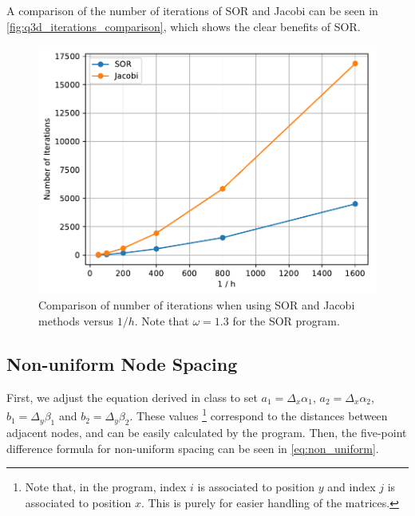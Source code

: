 \documentclass[a4paper,titlepage]{article}
\begin{document}
	A comparison of the number of iterations of SOR and Jacobi can be seen in \autoref{fig:q3d_iterations_comparison}, which shows the clear benefits of SOR.

	\begin{figure}[!htb]
		\centering
		\includegraphics[width=\columnwidth]{plots/q3d_iterations_comparison.pdf}
		\caption
		{Comparison of number of iterations when using SOR and Jacobi methods versus $1/h$. Note that $\omega=1.3$ for the SOR program.}
		\label{fig:q3d_iterations_comparison}
	\end{figure}
	
	\subsection{Non-uniform Node Spacing}
	
	First, we adjust the equation derived in class to set $a_1 = \Delta_x\alpha_1$, $a_2 = \Delta_x\alpha_2$, $b_1 = \Delta_y\beta_1$ and $b_2 = \Delta_y\beta_2$. These values \footnote{Note that, in the program, index $i$ is associated to position $y$ and index $j$ is associated to position $x$. This is purely for easier handling of the matrices.} correspond to the distances between adjacent nodes, and can be easily calculated by the program. Then, the five-point difference formula for non-uniform spacing can be seen in \autoref{eq:non_uniform}.
	
\end{document}

